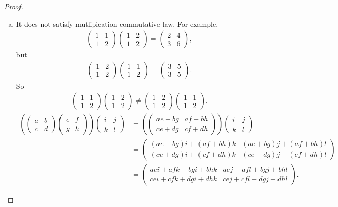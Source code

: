 \documentclass{amsart}
\newcommand{\aaa}{\left(\begin{smallmatrix}a&b\\c&d\end{smallmatrix}\right)}
\newcommand{\bbb}{\left(\begin{smallmatrix}e&f\\g&h\end{smallmatrix}\right)}
\newcommand{\ccc}{\left(\begin{smallmatrix}i&j\\k&l\end{smallmatrix}\right)}
\theoremstyle{plain}
\theoremstyle{definition}
\begin{document}
\begin{proof}
\begin{enumerate}[(a)]
		\item	
			It does not satisfy mutlipication commutative law.
			For example,
			\begin{align*}
			\left(\begin{smallmatrix}1&1\\1&2\end{smallmatrix}\right) \left(\begin{smallmatrix}1&2\\1&2\end{smallmatrix}\right)= \left(\begin{smallmatrix}2&4\\3&6\end{smallmatrix}\right),
			\end{align*}
			but 
			\begin{align*}
			\left(\begin{smallmatrix}1&2\\1&2\end{smallmatrix}\right) \left(\begin{smallmatrix}1&1\\1&2\end{smallmatrix}\right) =  \left(\begin{smallmatrix}3&5\\3&5\end{smallmatrix}\right).
			\end{align*}
		    So 
		    \begin{align*}
			\left(\begin{smallmatrix}1&1\\1&2\end{smallmatrix}\right) \left(\begin{smallmatrix}1&2\\1&2\end{smallmatrix}\right) \neq \left(\begin{smallmatrix}1&2\\1&2\end{smallmatrix}\right) \left(\begin{smallmatrix}1&1\\1&2\end{smallmatrix}\right).
			\end{align*}
			\begin{align*}
			\left(\aaa\bbb\right)\ccc &= \left( \left(\begin{smallmatrix}ae+bg&af+bh\\ce+dg&cf+dh\end{smallmatrix}\right) \right)\ccc \\ &=  \left(\begin{smallmatrix}(ae+bg)i+(af+bh)k&(ae+bg)j+(af+bh)l\\(ce+dg)i+(cf+dh)k&(ce+dg)j+(cf+dh)l\end{smallmatrix}\right) \\&= \left(\begin{smallmatrix}aei+afk+bgi+bhk&aej+afl+bgj+bhl\\cei+cfk+dgi+dhk&cej+cfl+dgj+dhl\end{smallmatrix}\right).

\end{align*}
\end{enumerate}
\end{proof}
\end{document}
